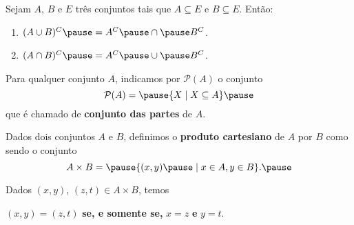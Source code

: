 \documentclass{beamer}
\begin{document}
    \begin{frame}
        \begin{proposicao}
            Sejam $A$, $B$ e $E$ três conjuntos \pause tais que $A\subseteq E$ \pause e $B\subseteq E$. \pause Então:\pause
            \begin{enumerate}[label={\roman*})]
                \item $(A\cup B)^C \pause = A^C \pause \cap \pause B^C$.\pause
                \item $(A\cap B)^C \pause = A^C \pause \cup \pause B^C$.
            \end{enumerate}
        \end{proposicao}
    \end{frame}

    \begin{frame}
        \begin{definicao}
            Para qualquer conjunto $A$, \pause indicamos por $\mathcal{P}(A)$ \pause o conjunto\pause
            \[
                \mathcal{P}(A) = \pause \{ X \mid X\subseteq A\}\pause
            \]
            que é chamado de \textbf{conjunto das partes} de $A$.
        \end{definicao}
    \end{frame}

    \begin{frame}
        \begin{definicao}
        Dados dois conjuntos $A$ e $B$, \pause definimos o \textbf{produto cartesiano} \pause de $A$ por $B$ como sendo o conjunto\pause
        \[
            A \times B = \pause \{(x,y) \pause \mid x\in A, y\in B\}.\pause
        \]
        \end{definicao}

        Dados $(x,y)$, \pause $(z,t) \in A\times B$, \pause temos
        \begin{center}
            $(x,y) = (z,t)$ \pause \textbf{se, e somente se,} $x = z$ \pause \textbf{e} $y = t$.
        \end{center}

    \end{frame}
\end{document}
